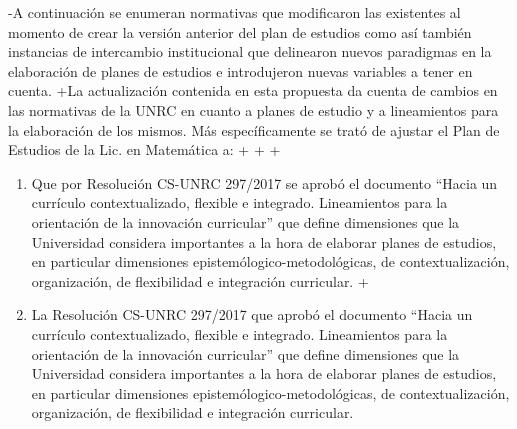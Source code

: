 -A continuación se enumeran normativas que modificaron las existentes al momento de crear la versión anterior del plan de estudios como así también instancias de intercambio institucional que delinearon nuevos paradigmas en la elaboración de planes de estudios e introdujeron nuevas variables a tener en cuenta.
+La actualización  contenida en esta propuesta da cuenta de cambios en las normativas de la UNRC en cuanto a planes de estudio y a lineamientos para la elaboración de los  mismos. Más específicamente se trató de ajustar el Plan de Estudios de la Lic. en Matemática a:
+
+
+
 \begin{enumerate}
- \item Que por Resolución CS-UNRC 297/2017 se aprobó el documento ``Hacia   un   currículo contextualizado, flexible e integrado. Lineamientos para la orientación de la innovación  curricular'' que define dimensiones que la Universidad considera importantes a la hora de elaborar planes de estudios, en particular dimensiones epistemólogico-metodológicas, de contextualización, organización, de flexibilidad e integración curricular. 
+ \item La Resolución CS-UNRC 297/2017 que aprobó el documento ``Hacia   un   currículo contextualizado, flexible e integrado. Lineamientos para la orientación de la innovación  curricular'' que define dimensiones que la Universidad considera importantes a la hora de elaborar planes de estudios, en particular dimensiones epistemólogico-metodológicas, de contextualización, organización, de flexibilidad e integración curricular. 
 

\end{enumerate}
